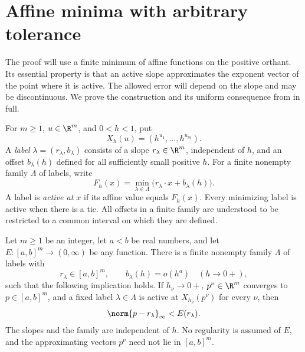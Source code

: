 \section{Affine minima with arbitrary tolerance}
\label{sec:affine}

The proof will use a finite minimum of affine functions on the positive
orthant. Its essential property is that an active slope approximates the
exponent vector of the point where it is active. The allowed error will
depend on the slope and may be discontinuous. We prove the construction
and its uniform consequence from
\cite[Lemma~2.1 and Corollary~2.2]{OpenAI2026} in full.

For $m\geq1$, $u\in\R^m$, and $0<h<1$, put
\[
 X_h(u)=(h^{u_1},\ldots,h^{u_m}).
\]
A \emph{label} $\lambda=(r_\lambda,b_\lambda)$ consists of a slope
$r_\lambda\in\R^m$, independent of $h$, and an offset $b_\lambda(h)$
defined for all sufficiently small positive $h$. For a finite nonempty
family $\Lambda$ of labels, write
\[
 F_h(x)=\min_{\lambda\in\Lambda}
       \bigl(r_\lambda\cdot x+b_\lambda(h)\bigr).
\]
A label is \emph{active at $x$} if its affine value equals $F_h(x)$.
Every minimizing label is active when there is a tie. All offsets in a
finite family are understood to be restricted to a common interval on
which they are defined.

\begin{lemma}
\label{lem:affine}
Let $m\geq1$ be an integer, let $a<b$ be real numbers, and let
$E:[a,b]^m\to(0,\infty)$ be any function. There is a finite nonempty
family $\Lambda$ of labels with
\[
 r_\lambda\in[a,b]^m,
 \qquad b_\lambda(h)=o(h^a)\quad(h\to0+),
\]
such that the following implication holds. If $h_\nu\to0+$,
$p^\nu\in\R^m$ converges to $p\in[a,b]^m$, and a fixed label
$\lambda\in\Lambda$ is active at $X_{h_\nu}(p^\nu)$ for every $\nu$,
then
\[
 \norm{p-r_\lambda}_\infty<E(r_\lambda).
\]
The slopes and the family are independent of $h$. No regularity is
assumed of $E$, and the approximating vectors $p^\nu$ need not lie in
$[a,b]^m$.
\end{lemma}
